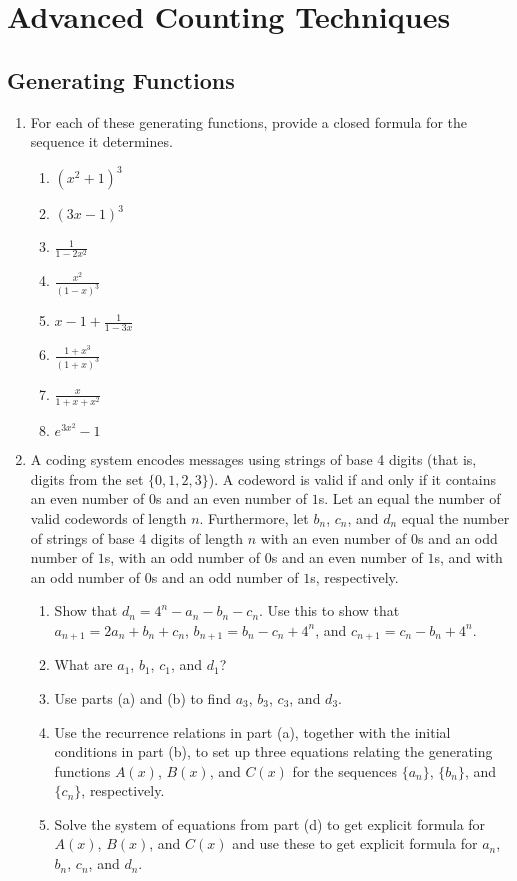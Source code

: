 \documentclass{sig-alternate-05-2015}
\begin{document}
\section{Advanced Counting Techniques}
\subsection{Generating Functions}
\begin{enumerate}
	\item For each of these generating functions, provide a closed
	formula for the sequence it determines.
	\begin{enumerate}
		\item $(x^2 + 1)^3$
		\item $(3x - 1)^3$
		\item $\frac{1}{1 - 2x^2} $
		\item $\frac{x^2}{(1 - x)^3}$
		\item $x - 1 + \frac{1}{1 - 3x}$
		\item $\frac{1 + x^3}{(1 + x)^3}$
		\item $\frac{x}{1 + x + x^2}$
		\item $e^{3x^2} - 1$
	\end{enumerate}
	
	\item A coding system encodes messages using strings of
	base 4 digits (that is, digits from the set $\{0, 1, 2, 3\}$). A codeword is valid if and only if it contains an even
	number of $0$s and an even number of $1$s. Let an equal the number of valid codewords of length $n$. Furthermore, let $b_n$, $c_n$, and $d_n$ equal the number of strings of base 4 digits of length $n$ with an even number of $0$s and an odd number of $1$s, with an odd number of $0$s and an even number of $1$s, and with an odd number of $0$s and an odd number of $1$s, respectively. \begin{enumerate}
		\item Show that $d_n = 4^n - a_n - b_n - c_n$. Use this to show that $a_{n+1} = 2a_n + b_n + c_n$, $b_{n+1} = b_n - c_n + 4^n$, and $c_{n+1} = c_n - b_n + 4^n$.
		\item What are $a_1$, $b_1$, $c_1$, and $d_1$?
		\item Use parts (a) and (b) to find $a_3$, $b_3$, $c_3$, and $d_3$.
		\item Use the recurrence relations in part (a), together with the initial conditions in part (b), to set up three equations relating the generating functions $A(x)$, $B(x)$, and $C(x)$ for the sequences $\{a_n\}$, $\{b_n\}$, and $\{c_n\}$, respectively.
		\item Solve the system of equations from part (d) to get explicit formula for $A(x)$, $B(x)$, and $C(x)$ and use these to get explicit formula for $a_n$, $b_n$, $c_n$, and $d_n$.
	\end{enumerate}
\end{enumerate}
\end{document}
